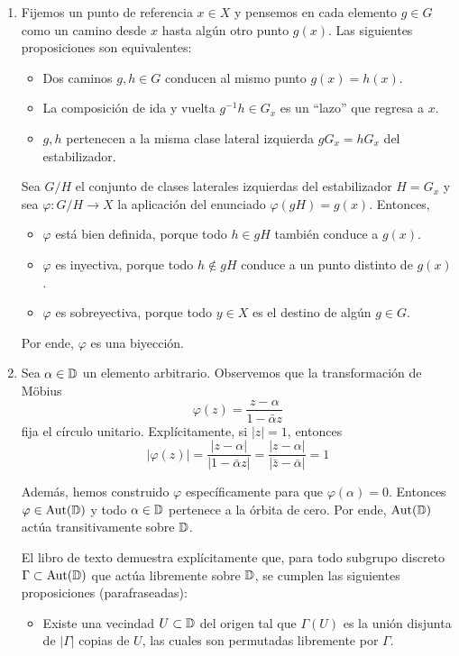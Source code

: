 \begin{solution}
\begin{enumerate}[label=\alph*)]
    \item Fijemos un punto de referencia $x \in X$ y pensemos en cada elemento $g \in G$ como un camino desde $x$ hasta algún otro punto $g(x)$. Las siguientes proposiciones son equivalentes:
    \begin{itemize}
        \item Dos caminos $g, h \in G$ conducen al mismo punto $g(x) = h(x)$.
        \item La composición de ida y vuelta $g^{-1} h \in G_x$ es un ``lazo'' que regresa a $x$.
        \item $g, h$ pertenecen a la misma clase lateral izquierda $gG_x = hG_x$ del estabilizador.
    \end{itemize}
    
    Sea $G/H$ el conjunto de clases laterales izquierdas del estabilizador $H = G_x$ y sea $\varphi : G/H \to X$ la aplicación del enunciado $\varphi(gH) = g(x)$. Entonces,
    \begin{itemize}
        \item $\varphi$ está bien definida, porque todo $h \in gH$ también conduce a $g(x)$.
        \item $\varphi$ es inyectiva, porque todo $h \notin gH$ conduce a un punto distinto de $g(x)$.
        \item $\varphi$ es sobreyectiva, porque todo $y \in X$ es el destino de algún $g \in G$.
    \end{itemize}
    
    Por ende, $\varphi$ es una biyección.
    
    \item Sea $\alpha \in \mathbb D$ un elemento arbitrario. Observemos que la transformación de Möbius
    $$\varphi(z) = \frac {z - \alpha} {1 - \bar \alpha z}$$
    fija el círculo unitario. Explícitamente, si $|z| = 1$, entonces
    $$
    |\varphi(z)|
        = \frac {|z - \alpha|} {|1 - \bar \alpha z|}
        = \frac {|z - \alpha|} {|\bar z - \bar \alpha|}
        = 1
    $$
    
    Además, hemos construido $\varphi$ específicamente para que $\varphi(\alpha) = 0$. Entonces $\varphi \in \operatorname{Aut}(\mathbb D)$ y todo $\alpha \in \mathbb D$ pertenece a la órbita de cero. Por ende, $\operatorname{Aut}(\mathbb D)$ actúa transitivamente sobre $\mathbb D$.
    
    El libro de texto demuestra explícitamente que, para todo subgrupo discreto $\Gamma \subset \operatorname{Aut}(\mathbb D)$ que actúa libremente sobre $\mathbb D$, se cumplen las siguientes proposiciones (parafraseadas):
    \begin{itemize}
        \item Existe una vecindad $U \subset \mathbb D$ del origen tal que $\Gamma(U)$ es la unión disjunta de $|\Gamma|$ copias de $U$, las cuales son permutadas libremente por $\Gamma$.
        

\end{itemize}
\end{enumerate}
\end{solution}
